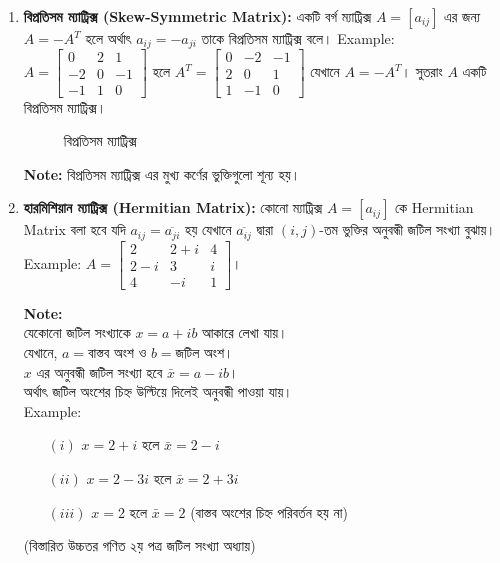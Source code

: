 \begin{enumerate}
	\item \textbf{বিপ্রতিসম ম্যাট্রিক্স (Skew-Symmetric Matrix):} একটি বর্গ ম্যাট্রিক্স $A=[a_{ij}]$ এর জন্য $A=-A^T$ হলে অর্থাৎ $a_{ij}=-a_{ji}$ তাকে বিপ্রতিসম ম্যাট্রিক্স বলে। Example: 
	$A=\left[\begin{array}{rrr}
	0 & 2 & 1 \\
	-2 & 0 & -1 \\
	-1 & 1 & 0
	\end{array}\right]$ হলে 
	$A^T=\left[\begin{array}{rrr}
	0 & -2 & -1 \\
	2 & 0 & 1 \\
	1 & -1 & 0
	\end{array}\right]$ যেখানে $A=-A^T$। সুতরাং $A$ একটি বিপ্রতিসম ম্যাট্রিক্স।
	\begin{figure}[h]
		\centering
		
		\caption{বিপ্রতিসম ম্যাট্রিক্স}
		\label{mat-fig-4}
	\end{figure}
	\begin{tcolorbox}
		\textbf{Note:} বিপ্রতিসম ম্যাট্রিক্স এর মুখ্য কর্ণের ভুক্তিগুলো শূন্য হয়।
	\end{tcolorbox}

	\item \textbf{হারমিশিয়ান ম্যাট্রিক্স (Hermitian Matrix):} কোনো ম্যাট্রিক্স $A=[a_{ij}]$ কে Hermitian Matrix বলা হবে যদি $a_{ij}=\overline{a_{ji}}$ হয় যেখানে $\overline{a_{ij}}$ দ্বারা $(i,j)$-তম ভুক্তির অনুবন্ধী জটিল সংখ্যা বুঝায়।\\ Example: $A=\left[\begin{array}{ccc}
		2 & 2+i & 4 \\
		2-i & 3 & i \\
		4 & -i & 1
		\end{array}\right]
		$।
	\begin{tcolorbox}
		\textbf{Note:}\\
		যেকোনো জটিল সংখ্যাকে $x=a+ib$ আকারে লেখা যায়।\\যেখানে, $a=$বাস্তব অংশ ও $b=$জটিল অংশ।\\ $x$ এর অনুবন্ধী জটিল সংখ্যা হবে $\bar{x}=a-ib$। \\অর্থাৎ জটিল অংশের চিহ্ন উল্টিয়ে দিলেই অনুবন্ধী পাওয়া যায়।\\ Example: 
		\begin{itemize}
			\item[$(i)$] $x=2+i$ হলে $\bar{x}=2-i$
			\item[$(ii)$] $x=2-3i$ হলে $\bar{x}=2+3i$
			\item[$(iii)$] $x=2$ হলে $\bar{x}=2$ (বাস্তব অংশের চিহ্ন পরিবর্তন হয় না)
		\end{itemize}
		(বিস্তারিত উচ্চতর গণিত ২য় পত্র জটিল সংখ্যা অধ্যায়) 
	\end{tcolorbox}	


\end{enumerate}
